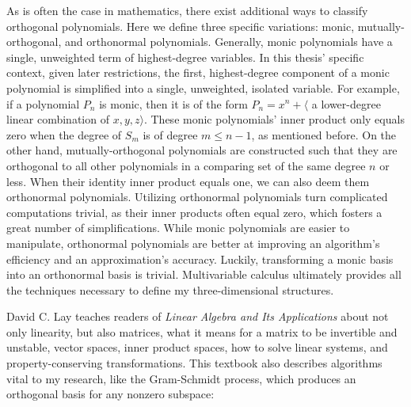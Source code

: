 \documentclass[letterpaper, 12pt]{article}
\begin{document}
\noindent As is often the case in mathematics, there exist additional ways to classify orthogonal polynomials. Here we define three specific variations: monic, mutually-orthogonal, and orthonormal polynomials. Generally, monic polynomials have a single, unweighted term of highest-degree variables. In this thesis' specific context, given later restrictions, the first, highest-degree component of a monic polynomial is simplified into a single, unweighted, isolated variable. For example, if a polynomial $P_n$ is monic, then it is of the form $P_n = x^n + \langle$ a lower-degree linear combination of $x, y, z \rangle$. These monic polynomials' inner product only equals zero when the degree of $S_m$ is of degree $m \leq n-1$, as mentioned before. On the other hand, mutually-orthogonal polynomials are constructed such that they are orthogonal to all other polynomials in a comparing set of the same degree $n$ or less. When their identity inner product equals one, we can also deem them orthonormal polynomials. Utilizing orthonormal polynomials turn complicated computations trivial, as their inner products often equal zero, which fosters a great number of simplifications. While monic polynomials are easier to manipulate, orthonormal polynomials are better at improving an algorithm's efficiency and an approximation's accuracy. Luckily, transforming a monic basis into an orthonormal basis is trivial. Multivariable calculus ultimately provides all the techniques necessary to define my three-dimensional structures.

David C. Lay teaches readers of \textit{Linear Algebra and Its Applications} \cite{lay} about not only linearity, but also matrices, what it means for a matrix to be invertible and unstable, vector spaces, inner product spaces, how to solve linear systems, and property-conserving transformations. This textbook also describes algorithms vital to my research, like the Gram-Schmidt process, which produces an orthogonal basis for any nonzero subspace:
\end{document}
